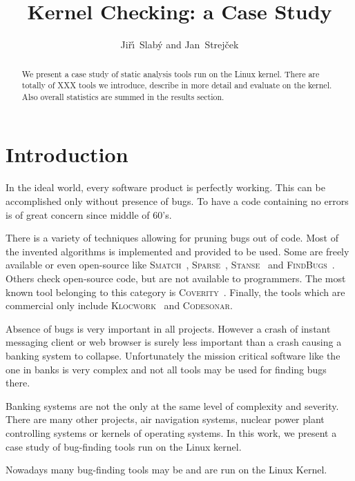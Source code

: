 \documentclass[10pt]{llncs}
\newcommand\Color[2]{\textcolor{#1}{#2}}
\newcommand{\nb}[1]{\marginpar{\scriptsize #1}}
\renewcommand\note[1]{\nb{\Color{blue}{#1}}}
\newcommand{\COV}{\textsc{Coverity}\xspace}
\newcommand{\SM}{\textsc{Smatch}\xspace}
\newcommand{\SP}{\textsc{Sparse}\xspace}
\newcommand{\ST}{\textsc{Stanse}\xspace}
\begin{document}
\title{Kernel Checking: a Case Study}
\author{Ji\v{r}\'\i~Slab\'y and Jan~Strej\v{c}ek}

\maketitle

\begin{abstract}
We present a case study of static analysis tools run on the Linux kernel.
There are totally of XXX tools we introduce, describe in more detail and
evaluate on the kernel. Also overall statistics are summed in the results
section.
\end{abstract}

\section{Introduction}
\label{sec:introduction}
In the ideal world, every software product is perfectly working. This can be
accomplished only without presence of bugs. To have a code containing no
errors is of great concern since middle of 60's\note{fakt?}. 

There is a variety of techniques allowing for pruning bugs out of code. Most
of the invented algorithms is implemented and provided to be used. Some are
freely available or even open-source like \SM~\cite{smatch},
\SP~\cite{sparse}, \ST~\cite{stanse} and \textsc{FindBugs}~\cite{findbugs}.
Others check open-source code, but are not available to programmers. The most
known tool belonging to this category is \COV~\cite{coverity}. Finally, the
tools which are commercial only include \textsc{Klocwork}~\cite{klocwork} and
\textsc{Codesonar}\cite{codesonar}.

Absence of bugs is very important in all projects. However a crash of instant
messaging client or web browser is surely less important than a crash causing
a banking system to collapse. Unfortunately the mission critical software like
the one in banks is very complex and not all tools may be used for finding
bugs there.

Banking systems are not the only at the same level of complexity and severity.
There are many other projects, air navigation systems, nuclear power plant
controlling systems or kernels of operating systems. In this work, we present
a case study of bug-finding tools run on the Linux kernel.

Nowadays many bug-finding tools may be and are run on the Linux Kernel.
\end{document}

